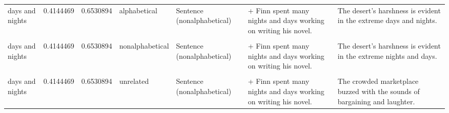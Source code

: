 \documentclass[
  12pt,
]{scrartcl}
\begin{document}
\begin{landscape}
\begin{longtable}{lrrllll}
\addlinespace
days and nights & 0.4144469 & 0.6530894 & alphabetical & Sentence (nonalphabetical) & + Finn spent many nights and days working on writing his novel. & The desert's harshness is evident in the extreme days and nights.\\
\cellcolor{gray!6}{days and nights} & \cellcolor{gray!6}{0.4144469} & \cellcolor{gray!6}{0.6530894} & \cellcolor{gray!6}{nonalphabetical} & \cellcolor{gray!6}{Sentence (alphabetical)} & \cellcolor{gray!6}{+ Finn spent many days and nights working on writing his novel.} & \cellcolor{gray!6}{The desert's harshness is evident in the extreme nights and days.}\\
days and nights & 0.4144469 & 0.6530894 & nonalphabetical & Sentence (nonalphabetical) & + Finn spent many nights and days working on writing his novel. & The desert's harshness is evident in the extreme nights and days.\\
\cellcolor{gray!6}{days and nights} & \cellcolor{gray!6}{0.4144469} & \cellcolor{gray!6}{0.6530894} & \cellcolor{gray!6}{unrelated} & \cellcolor{gray!6}{Sentence (alphabetical)} & \cellcolor{gray!6}{+ Finn spent many days and nights working on writing his novel.} & \cellcolor{gray!6}{The crowded marketplace buzzed with the sounds of bargaining and laughter.}\\
days and nights & 0.4144469 & 0.6530894 & unrelated & Sentence (nonalphabetical) & + Finn spent many nights and days working on writing his novel. & The crowded marketplace buzzed with the sounds of bargaining and laughter.\\
\bottomrule

\end{longtable}

\endgroup{}

\end{landscape}
\end{document}
